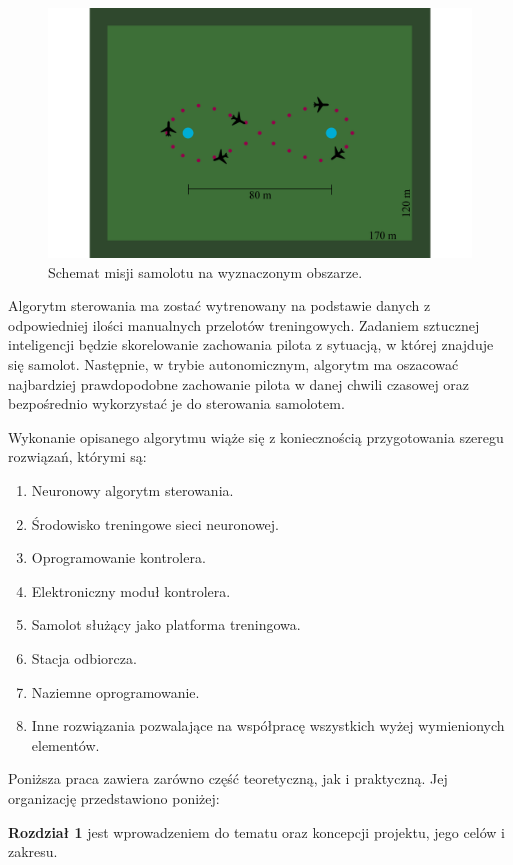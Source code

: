 \documentclass[12pt, a4paper]{article}
\begin{document}
\begin{figure}[ht]
    \centering
    \includegraphics[width=1\textwidth]{osemka}
    \caption{Schemat misji samolotu na wyznaczonym obszarze.}
    \label{fig:osemka}
\end{figure}

Algorytm sterowania ma zostać wytrenowany na podstawie danych z odpowiedniej ilości manualnych przelotów treningowych. Zadaniem sztucznej inteligencji będzie skorelowanie zachowania pilota z sytuacją, w której znajduje się samolot. Następnie, w trybie autonomicznym, algorytm ma oszacować najbardziej prawdopodobne zachowanie pilota w danej chwili czasowej oraz bezpośrednio wykorzystać je do sterowania samolotem. 

Wykonanie opisanego algorytmu wiąże się z koniecznością przygotowania szeregu rozwiązań, którymi są:
\begin{enumerate}
	\item Neuronowy algorytm sterowania.
	\item Środowisko treningowe sieci neuronowej.
	\item Oprogramowanie kontrolera.
	\item Elektroniczny moduł kontrolera.
	\item Samolot służący jako platforma treningowa.
	\item Stacja odbiorcza.
	\item Naziemne oprogramowanie.
	\item Inne rozwiązania pozwalające na współpracę wszystkich wyżej wymienionych elementów.
\end{enumerate}

Poniższa praca zawiera zarówno część teoretyczną, jak i praktyczną. Jej organizację przedstawiono poniżej:

\textbf{Rozdział 1} jest wprowadzeniem do tematu oraz koncepcji projektu, jego celów i zakresu.
\end{document}
